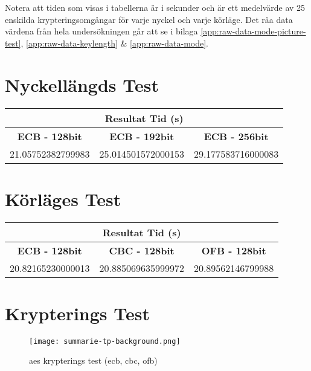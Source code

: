 \label{chap:resultat}
Notera att tiden som visas i tabellerna är i sekunder och är ett medelvärde av 25 enskilda
krypteringsomgångar för varje nyckel och varje körläge. Det råa data värdena från hela undersökningen
går att se i bilaga \ref{app:raw-data-mode-picture-test}, \ref{app:raw-data-keylength} \& \ref{app:raw-data-mode}.

\section{Nyckellängds Test}
\label{sec:nyckellangd}

\begin{table}[H]
    \centering
    \begin{tabular}{ ||c|c|c|| }
      \hline
      \multicolumn{3}{|c|}{\bfseries{Resultat Tid (s)}} \\
      \hline
      \bfseries{ECB - 128bit} & \bfseries{ECB - 192bit} & \bfseries{ECB - 256bit} \\
      \hline
      21.05752382799983 & 25.014501572000153 & 29.177583716000083 \\
      \hline
    \end{tabular}
\end{table}

\section{Körläges Test}
\label{sec:korlages}

\begin{table}[H]
    \centering
    \begin{tabular}{ ||c|c|c|| }
      \hline
      \multicolumn{3}{|c|}{\bfseries{Resultat Tid (s)}} \\
      \hline
      \bfseries{ECB - 128bit} & \bfseries{CBC - 128bit} & \bfseries{OFB - 128bit} \\
      \hline
      20.82165230000013 & 20.885069635999972 & 20.89562146799988 \\
      \hline
    \end{tabular}
\end{table}

\section{Krypterings Test}
\label{sec:krypterings-test}

\begin{figure}[H]
    \texttt{[image: summarie-tp-background.png]}
    \caption{\acrshort{aes} krypterings test (\acrshort{ecb}, \acrshort{cbc}, \acrshort{ofb})}
    \label{fig:aes-krypterings-test}
\end{figure}
